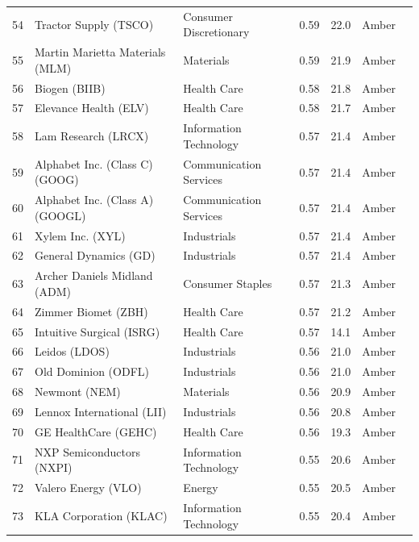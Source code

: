 \documentclass[11pt,a4paper]{article}
\begin{document}
{\begin{longtable}{r p{4.4cm} p{2.8cm} r r l l}
54 & Tractor Supply (TSCO) & Consumer Discretionary & 0.59 & 22.0 & \cellcolor[HTML]{FFEB9C}Amber &  \\
55 & Martin Marietta Materials (MLM) & Materials & 0.59 & 21.9 & \cellcolor[HTML]{FFEB9C}Amber &  \\
56 & Biogen (BIIB) & Health Care & 0.58 & 21.8 & \cellcolor[HTML]{FFEB9C}Amber &  \\
57 & Elevance Health (ELV) & Health Care & 0.58 & 21.7 & \cellcolor[HTML]{FFEB9C}Amber &  \\
58 & Lam Research (LRCX) & Information Technology & 0.57 & 21.4 & \cellcolor[HTML]{FFEB9C}Amber &  \\
59 & Alphabet Inc. (Class C) (GOOG) & Communication Services & 0.57 & 21.4 & \cellcolor[HTML]{FFEB9C}Amber &  \\
60 & Alphabet Inc. (Class A) (GOOGL) & Communication Services & 0.57 & 21.4 & \cellcolor[HTML]{FFEB9C}Amber &  \\
61 & Xylem Inc. (XYL) & Industrials & 0.57 & 21.4 & \cellcolor[HTML]{FFEB9C}Amber &  \\
62 & General Dynamics (GD) & Industrials & 0.57 & 21.4 & \cellcolor[HTML]{FFEB9C}Amber &  \\
63 & Archer Daniels Midland (ADM) & Consumer Staples & 0.57 & 21.3 & \cellcolor[HTML]{FFEB9C}Amber &  \\
64 & Zimmer Biomet (ZBH) & Health Care & 0.57 & 21.2 & \cellcolor[HTML]{FFEB9C}Amber &  \\
65 & Intuitive Surgical (ISRG) & Health Care & 0.57 & 14.1 & \cellcolor[HTML]{FFEB9C}Amber &  \\
66 & Leidos (LDOS) & Industrials & 0.56 & 21.0 & \cellcolor[HTML]{FFEB9C}Amber &  \\
67 & Old Dominion (ODFL) & Industrials & 0.56 & 21.0 & \cellcolor[HTML]{FFEB9C}Amber &  \\
68 & Newmont (NEM) & Materials & 0.56 & 20.9 & \cellcolor[HTML]{FFEB9C}Amber &  \\
69 & Lennox International (LII) & Industrials & 0.56 & 20.8 & \cellcolor[HTML]{FFEB9C}Amber &  \\
70 & GE HealthCare (GEHC) & Health Care & 0.56 & 19.3 & \cellcolor[HTML]{FFEB9C}Amber &  \\
71 & NXP Semiconductors (NXPI) & Information Technology & 0.55 & 20.6 & \cellcolor[HTML]{FFEB9C}Amber &  \\
72 & Valero Energy (VLO) & Energy & 0.55 & 20.5 & \cellcolor[HTML]{FFEB9C}Amber &  \\
73 & KLA Corporation (KLAC) & Information Technology & 0.55 & 20.4 & \cellcolor[HTML]{FFEB9C}Amber &  \\

\end{longtable}}
\end{document}
